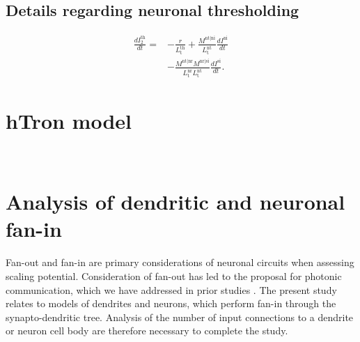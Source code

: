\documentclass[twocolumn]{article}
\begin{document}

%

\subsection{\label{apx:neuronal_thresholding}Details regarding neuronal thresholding}
\begin{equation}
\label{eq:neuronal_thresholding}
\begin{split}
\frac{dI^{\mathrm{th}}_2}{dt} = & - \frac{r}{L^{\mathrm{th}}_{\mathrm{t}}} + \frac{M^{\mathrm{\mathrm{nt}}|\mathrm{ni}}}{L^{\mathrm{nt}}_{\mathrm{t}}} \frac{dI^{\mathrm{ni}}}{dt} \\
& - \frac{ M^{\mathrm{nt}|\mathrm{nr}} M^{\mathrm{\mathrm{nr}}|\mathrm{si}} }{ L^{\mathrm{nr}}_{\mathrm{t}} L^{\mathrm{nt}}_{\mathrm{t}} } \frac{dI^{\mathrm{si}}}{dt}.
\end{split}
\end{equation}

\section{\label{apx:hTron}hTron model}

\

\section{\label{apx:fan_in}Analysis of dendritic and neuronal fan-in}

Fan-out and fan-in are primary considerations of neuronal circuits when assessing scaling potential. Consideration of fan-out has led to the proposal for photonic communication, which we have addressed in prior studies \cite{shbu2017,chbu2017,chbu2018,sh2018_ICRC,sh2019,sh2020}. The present study relates to models of dendrites and neurons, which perform fan-in through the synapto-dendritic tree. Analysis of the number of input connections to a dendrite or neuron cell body are therefore necessary to complete the study.
\end{document}
